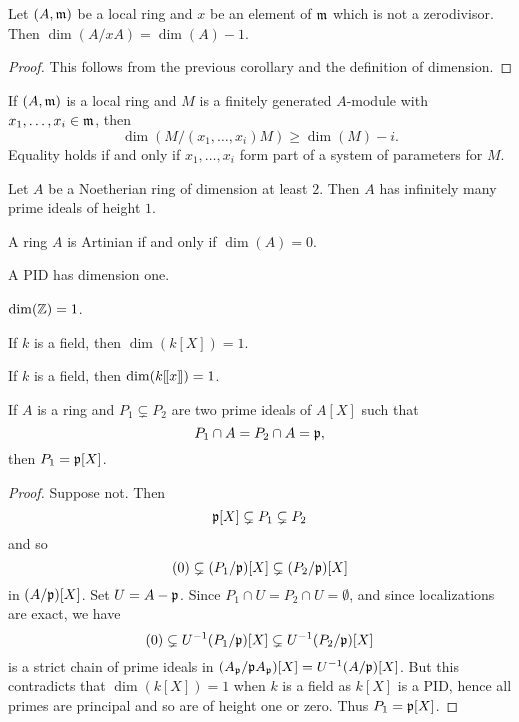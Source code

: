 \documentclass{ximera}
\begin{document}
\begin{corollary}\label{C:nzdd-1} Let $(A,\mathfrak{m})$ be a local ring and $x$ be an element of $\mathfrak{m}$ which is not a zerodivisor. Then $\dim(A/xA) = \dim(A)-1$.
\end{corollary}

\begin{proof} This follows from the previous corollary and the definition of dimension.
\end{proof}


\begin{exercise} If $(A,\mathfrak{m})$ is a local ring and $M$ is a finitely generated $A$-module with $x_1,\dots,x_i\in\mathfrak{m}$, then 
\[
\dim(M/(x_1,\dots,x_i)M)\ge \dim(M) -i.
\]
Equality holds if and only if $x_1,\dots,x_i$ form part of a system of parameters for $M$.
\end{exercise}

\begin{exercise} Let $A$ be a Noetherian ring of dimension at least $2$. Then $A$ has infinitely many prime ideals of height $1$.
\end{exercise}

\begin{example} A ring $A$ is Artinian if and only if $\dim(A) = 0$. 
\end{example}

\begin{example} A PID has dimension one.
\end{example}

\begin{example} $\dim(\mathbb Z) = 1$.
\end{example}

\begin{example} If $k$ is a field, then $\dim(k[X]) = 1$.
\end{example}

\begin{example} If $k$ is a field, then $\dim(k[\hspace{-0.25ex}[ x ]\hspace{-0.25ex}]) = 1$.
\end{example}


\begin{lemma}\label{L:FT1} If $A$ is a ring and $P_1\subsetneq P_2$ are two prime ideals of $A[X]$ such that
\[
P_1\cap A = P_2\cap A = \mathfrak{p},
\]
then $P_1 = \mathfrak{p}[X]$.
\end{lemma}

\begin{proof} Suppose not. Then 
\[
\mathfrak{p}[X]\subsetneq P_1\subsetneq P_2 
\]
and so 
\[
(0) \subsetneq (P_1/\mathfrak{p})[X] \subsetneq (P_2/\mathfrak{p})[X]
\]
in $(A/\mathfrak{p}) [X]$. Set $U = A-\mathfrak{p}$.  Since $P_1 \cap U = P_2 \cap U = \emptyset$, and since localizations are exact, we have
\[
(0) \subsetneq U^{-1}(P_1/\mathfrak{p})[X] \subsetneq U^{-1}(P_2/\mathfrak{p})[X]
\]
is a strict chain of prime ideals in $(A_{\mathfrak{p}}/\mathfrak{p} A_{\mathfrak{p}})[X] = U^{-1}(A/\mathfrak{p})[X]$.  But this contradicts that $\dim(k[X]) = 1$ when $k$ is a field as $k[X]$ is a PID, hence all primes are principal and so are of height one or zero.  Thus $P_1 = \mathfrak{p}[X]$.
\end{proof}
\end{document}
